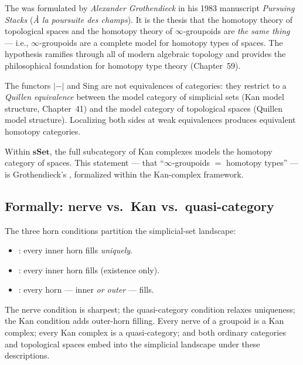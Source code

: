 \begin{nameorigin}
The  was formulated by \emph{Alexander
Grothendieck} in his 1983 manuscript \emph{Pursuing Stacks} (\emph{À la
poursuite des champs}). It is the thesis that the homotopy theory of
topological spaces and the homotopy theory of $\infty$-groupoids are
\emph{the same thing} — i.e., $\infty$-groupoids are a complete model
for homotopy types of spaces. The hypothesis ramifies through all of
modern algebraic topology and provides the philosophical foundation for
homotopy type theory (Chapter~59).
\end{nameorigin}

\begin{remark}
The functors $\lvert{-}\rvert$ and $\mathrm{Sing}$ are not equivalences
of categories: they restrict to a \emph{Quillen equivalence} between the
model category of simplicial sets (Kan model structure, Chapter~41) and
the model category of topological spaces (Quillen model structure).
Localizing both sides at weak equivalences produces equivalent homotopy
categories.

Within $\mathbf{sSet}$, the full subcategory of Kan complexes models the
homotopy category of spaces. This statement — that ``$\infty$-groupoids
$=$ homotopy types'' — is Grothendieck's ,
formalized within the Kan-complex framework.
\end{remark}

\subsection{Formally: nerve vs.\ Kan vs.\ quasi-category}

\begin{remark}
\label{rem:three-horn-conditions}
The three horn conditions partition the simplicial-set landscape:
\begin{itemize}
  \item {}: every inner horn fills \emph{uniquely}.
  \item {}: every inner horn fills (existence only).
  \item {}: every horn — inner \emph{or outer} — fills.
\end{itemize}
The nerve condition is sharpest; the quasi-category condition relaxes
uniqueness; the Kan condition adds outer-horn filling. Every nerve of a
groupoid is a Kan complex; every Kan complex is a quasi-category; and
both ordinary categories and topological spaces embed into the
simplicial landscape under these descriptions.
\end{remark}

